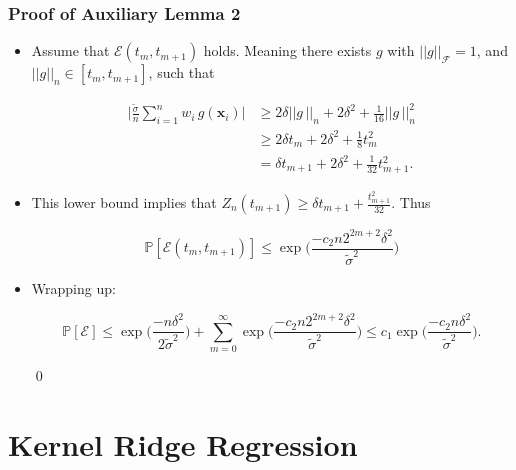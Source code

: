 \documentclass[11pt]{beamer}
\newcommand{\Prob}{\mathbb{P}}
\newcommand{\bx}{\mathbf{x}}
\newcommand{\cF}{\mathcal{F}}
\begin{document}
	\begin{frame}
		\frametitle{Proof of Auxiliary Lemma 2}
		\begin{itemize}
			\item Assume that $\mathcal{E}(t_m , t_{m+1})$ holds. Meaning there exists $g$ with $||g||_\cF = 1$, and $||g||_n\in[t_m, t_{m+1}]$, such that
			\begin{small}
				\begin{align*}
					\Big|\frac{\tilde \sigma}{n}\sum_{i = 1}^{n}w_i\,g(\bx_i)\Big| &\geq 2\delta ||g\,||_n + 2\delta^2 +\frac{1}{16} ||g\,||_n^2\\
					&\geq 2\delta t_m + 2\delta^2 + \frac{1}{8}t_m^2\\
					&= \delta t_{m+1} + 2\delta^2 + \frac{1}{32} t_{m+1}^2.
				\end{align*}				
			\end{small}
		\item This lower bound implies that $Z_n(t_{m+1}) \geq \delta t_{m+1} + \frac{t_{m+1}^2}{32}$. Thus
		\begin{small}
			\begin{equation*}
				\Prob[\mathcal{E}(t_m, t_{m+1})] \leq \exp\Big(\frac{-c_2 n 2^{2m+2}\delta^2}{\tilde\sigma^2}\Big)
			\end{equation*}
		\end{small}
		\item Wrapping up:
		\begin{small}
			\begin{equation*}
				\Prob[\mathcal{E}] \leq \exp\Big(\frac{-n\delta^2}{2\tilde\sigma^2}\Big) + \sum_{m = 0}^{\infty} \exp\Big(\frac{-c_2 n 2^{2m+2}\delta^2}{\tilde\sigma^2}\Big) 				
				\leq c_1 \exp\Big(\frac{-c_2n\delta^2}{\tilde{\sigma}^2}\Big).
			\end{equation*}
		\end{small}\qed
		\end{itemize}
	\end{frame}

\section{Kernel Ridge Regression}
\frame{\sectionpage}
\end{document}
